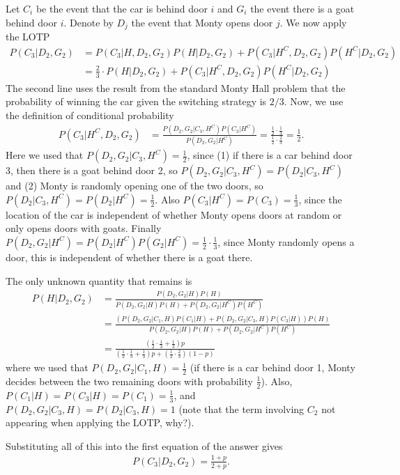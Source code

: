 \begin{exercise}[BH.2.19]
\begin{solution}
\begin{enumerate}
		Let $C_{i}$ be the event that the car is behind door $i$ and $G_{i}$ the event there is a goat behind door $i$. Denote by $D_j$ the event that Monty opens door $j$. We now apply the LOTP
		\begin{align*}
			P(C_{3}|D_{2},G_{2})& = P(C_{3}|H,D_{2},G_{2})P(H|D_{2},G_{2}) + P(C_{3}|H^{C},D_{2},G_{2})P(H^{C}|D_{2},G_{2})\\
			& = \frac{2}{3}\cdot P(H|D_{2},G_{2}) + P(C_{3}|H^{C},D_{2},G_{2})P(H^{C}|D_{2},G_{2})
		\end{align*}
		The second line uses the result from the standard Monty Hall problem that the probability of winning the car given the switching strategy is $2/3$. Now, we use the definition of conditional probability
		\begin{align*}
			P(C_{3}|H^{C},D_{2},G_{2}) &=\frac{P(D_{2},G_{2}|C_{3},H^{C})P(C_{3}|H^{C})}{P(D_{2},G_{2}|H^{C})}=\frac{\frac{1}{2}\cdot \frac{1}{3}}{\frac{1}{2}\cdot \frac{2}{3}}=\frac{1}{2}.
		\end{align*}
		Here we used that $P(D_{2},G_{2}|C_{3},H^{C})=\frac{1}{2}$, since (1) if there is a car behind door 3, then there is a goat behind door 2, so $P(D_{2},G_{2}|C_{3},H^{C})=P(D_{2}|C_{3},H^{C})$ and (2) Monty is randomly opening one of the two doors, so $P(D_{2}|C_{3},H^{C})=P(D_{2}|H^{C})=\frac{1}{2}$. Also $P(C_{3}|H^{C})=P(C_{3})=\frac{1}{3}$, since the location of the car is independent of whether Monty opens doors at random or only opens doors with goats. Finally $P(D_{2},G_{2}|H^{C})=P(D_{2}|H^{C})P(G_{2}|H^{C})=\frac{1}{2}\cdot \frac{1}{3}$, since Monty randomly opens a door, this is independent of whether there is a goat there.

		The only unknown quantity that remains is
		\begin{align*}
			P(H|D_{2},G_{2})& = \frac{P(D_{2},G_{2}|H)P(H)}{P(D_{2},G_{2}|H)P(H)+P(D_{2},G_{2}|H^C)P(H^C)} \\
			&= \frac{(P(D_{2},G_{2}|C_{1},H)P(C_{1}|H)+P(D_{2},G_{2}|C_{3},H)P(C_{3}|H))P(H)}{P(D_{2},G_{2}|H)P(H)+P(D_{2},G_{2}|H^C)P(H^C)}\tag*{(LOTP)} \\
			&= \frac{(\frac{1}{2}\cdot \frac{1}{3}+\frac{1}{3})p}{(\frac{1}{2}\cdot \frac{1}{3}+\frac{1}{3})p+(\frac{1}{2}\cdot \frac{2}{3})(1-p)}
		\end{align*}
		where we used that $P(D_{2},G_{2}|C_{1},H)=\frac{1}{2}$ (if there is a car behind door 1, Monty decides between the two remaining doors with probability $\frac{1}{2}$). Also, $P(C_{1}|H)=P(C_{3}|H)=P(C_{1})=\frac{1}{3}$, and $P(D_{2},G_{2}|C_{3},H)=P(D_{2}|C_{3},H)=1$ (note that the term involving $C_{2}$ not appearing when applying the LOTP, why?). 

		Substituting all of this into the first equation of the answer gives
		\begin{align*}
			P(C_{3}|D_2,G_2) = \frac{1+p}{2+p}.
		\end{align*}
	\end{enumerate}
\end{solution}
\end{exercise}

